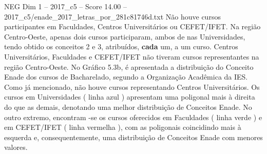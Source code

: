 \begin{textsample}{NEG Dim 1 – 2017\_c5 – Score 14.00 – 2017\_c5/enade\_2017\_letras\_por\_281c81746d.txt}
Não houve cursos participantes em Faculdades, Centros Universitários ou CEFET/IFET.
Na região Centro-Oeste, apenas dois cursos participaram, ambos de nas Universidades, tendo obtido os conceitos 2 e 3, atribuídos, \textbf{cada} um, a um curso.
Centros Universitários, Faculdades e CEFET/IFET não tiveram cursos representantes na região Centro-Oeste.
No Gráfico 5.3b, é apresentada a distribuição do Conceito Enade dos cursos de Bacharelado, segundo a Organização Acadêmica da IES.
Como já mencionado, não houve cursos representando Centros Universitários.
Os cursos em Universidades ( linha azul ) apresentam uma poligonal mais à direita do que as demais, denotando uma melhor distribuição de Conceitos Enade.
No outro extremo, encontram -se os cursos oferecidos em Faculdades ( linha verde ) e em CEFET/IFET ( linha vermelha ), com as poligonais coincidindo mais à esquerda e, consequentemente, uma distribuição de Conceitos Enade com menores valores.

\end{textsample}
